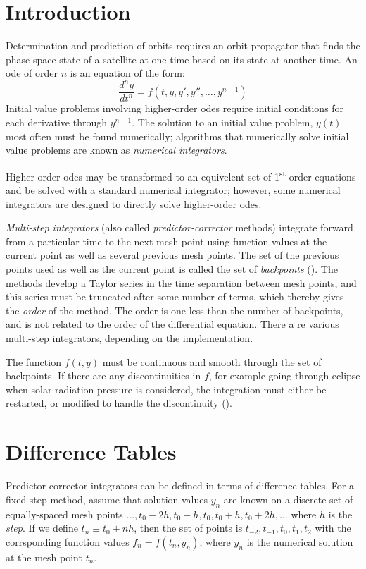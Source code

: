 \section{Introduction}
Determination and prediction of orbits requires an orbit propagator that finds the
phase space state of a satellite at one time based on its state at another time.
An \gls{ode} of order \( n \) is an equation of the form:
\begin{equation}
	\frac{d^n y}{dt^n} = f(t,y,y',y'',\ldots,y^{n-1})
\end{equation}
Initial value problems involving higher-order \glspl{ode} require initial conditions 
for each derivative through \( y^{n-1} \). 
The solution to an initial value problem, \( y(t) \) most often must be found numerically;
algorithms that numerically solve initial value problems are known as \emph{numerical integrators}.

Higher-order \glspl{ode} may be transformed to an equivelent set of 1\textsuperscript{st} 
order equations and be solved with a standard numerical integrator; however, some 
numerical integrators are designed to directly solve higher-order \glspl{ode}.

\emph{Multi-step integrators} (also called \emph{predictor-corrector} methods) 
integrate forward from a particular time to the next mesh
point using function values at the current point as well as several previous mesh
points. The set of the previous points used as well as the current point is called the
set of \emph{backpoints} (\cite{berry2004}). The methods develop a Taylor series 
in the time separation between mesh points, and this series must be truncated after 
some number of terms, which thereby gives the \emph{order} of the method. The order is one 
less than the number of backpoints, and is not related to the order of the differential equation.
There a re various multi-step integrators, depending on the implementation.

The function \( f(t,y) \) must be continuous and smooth through the set of 
backpoints. If there are any discontinuities in \( f \), for example going through eclipse when 
solar radiation pressure is considered, the integration must either be restarted, or 
modified to handle the discontinuity (\cite{berry2004}).

\section{Difference Tables}
Predictor-corrector integrators can be defined in terms of difference tables. 
For a fixed-step method, assume that solution values \( y_n \) are known on a 
discrete set of equally-spaced mesh points 
\( \ldots, t_0 - 2h , t_0 - h , t_0 , t_0 + h , t_0 + 2h , \ldots \)
where \( h \) is the \emph{step}. If we define \(  t_n \equiv t_0 + n h \), then the 
set of points is \( t_{-2}, t_{-1}, t_0 , t_{1}, t_{2} \) with the corrsponding 
function values \( f_n = f(t_n , y_n ) \), where \( y_n \) is the numerical solution 
at the mesh point \( t_n \).

